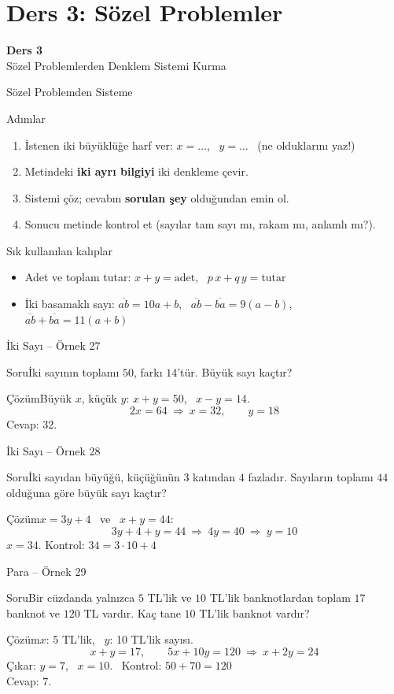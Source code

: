 \documentclass[aspectratio=169,11pt]{beamer}
\newcommand{\soru}[3]{%
\begin{frame}{#1}
  \begin{block}{Soru}\large #2\end{block}
  \pause
  \begin{exampleblock}{Çözüm}\large #3\end{exampleblock}
\end{frame}}
\newcommand{\ab}[1]{\overline{#1}}
\begin{document}
\section{Ders 3: Sözel Problemler}
\begin{frame}
\centering\Large\color{anamavi}\textbf{Ders 3}\\[6pt]\normalsize Sözel Problemlerden Denklem Sistemi Kurma
\end{frame}

\begin{frame}{Sözel Problemden Sisteme}
\begin{block}{Adımlar}
\begin{enumerate}
\item İstenen iki büyüklüğe harf ver: \(x=\dots\), \ \(y=\dots\) \ (ne olduklarını yaz!)
\item Metindeki \textbf{iki ayrı bilgiyi} iki denkleme çevir.
\item Sistemi çöz; cevabın \textbf{sorulan şey} olduğundan emin ol.
\item Sonucu metinde kontrol et (sayılar tam sayı mı, rakam mı, anlamlı mı?).
\end{enumerate}
\end{block}
\begin{block}{Sık kullanılan kalıplar}
\begin{itemize}
\item Adet ve toplam tutar: \(x+y=\text{adet}\), \ \(p\,x+q\,y=\text{tutar}\)
\item İki basamaklı sayı: \(\ab{ab}=10a+b\), \ \(\ab{ab}-\ab{ba}=9(a-b)\), \ \(\ab{ab}+\ab{ba}=11(a+b)\)
\end{itemize}
\end{block}
\end{frame}

\soru{İki Sayı -- Örnek 27}
{İki sayının toplamı \(50\), farkı \(14\)'tür. Büyük sayı kaçtır?}
{Büyük \(x\), küçük \(y\): \quad \(x+y=50\), \ \(x-y=14\).
\[2x=64\ \Rightarrow\ x=32,\qquad y=18\]
Cevap: \(32\).}

\soru{İki Sayı -- Örnek 28}
{İki sayıdan büyüğü, küçüğünün \(3\) katından \(4\) fazladır. Sayıların toplamı \(44\) olduğuna göre büyük sayı kaçtır?}
{\(x=3y+4\) \ ve \ \(x+y=44\):
\[3y+4+y=44\ \Rightarrow\ 4y=40\ \Rightarrow\ y=10\]
\(x=34\). \quad Kontrol: \(34=3\cdot 10+4\) \checkmark}

\soru{Para -- Örnek 29}
{Bir cüzdanda yalnızca \(5\) TL'lik ve \(10\) TL'lik banknotlardan toplam \(17\) banknot ve \(120\) TL vardır. Kaç tane \(10\) TL'lik banknot vardır?}
{\(x\): 5 TL'lik, \ \(y\): 10 TL'lik sayısı.
\[x+y=17,\qquad 5x+10y=120\ \Rightarrow\ x+2y=24\]
Çıkar: \(y=7\), \ \(x=10\). \ Kontrol: \(50+70=120\) \checkmark\\
Cevap: \(7\).}
\end{document}
